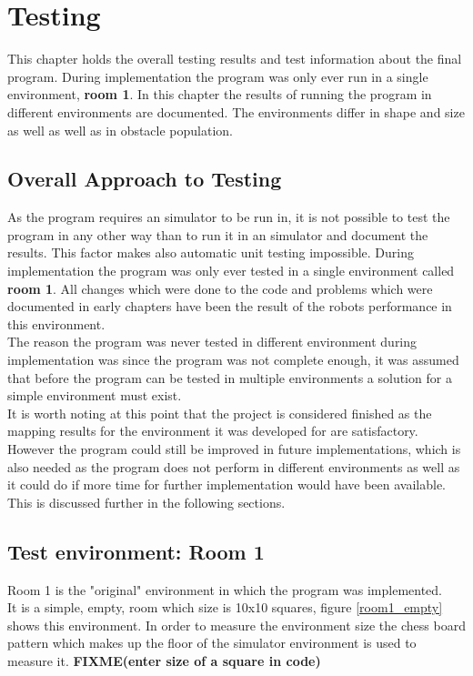 \chapter{Testing}
\label{Testing}
This chapter holds the overall testing results and test information about the final program.
During implementation the program was only ever run in a single environment, \textbf{room 1}.
In this chapter the results of running the program in different environments are documented. The environments differ in shape and size as well as well as in obstacle population.

\section{Overall Approach to Testing}
As the program requires an simulator to be run in, it is not possible to test the program in any other way than to run it in an simulator and document the results. This factor makes also automatic unit testing impossible. During implementation the program was only ever tested in a single environment called \textbf{room 1}. All changes which were done to the code and problems which were documented in early chapters have been the result of the robots performance in this environment. \\[3ex]

The reason the program was never tested in different environment during implementation was since the program was not complete enough, it was assumed that before the program can be tested in multiple environments a solution for a simple environment must exist.\\
It is worth noting at this point that the project is considered finished as the mapping results for the environment it was developed for are satisfactory. However the program could still be improved in future implementations, which is also needed as the program does not perform in different environments as well as it could do if more time for further implementation would have been available. 
This is discussed further in the following sections.

\section{Test environment: Room 1}
\label{room1}
Room 1 is the "original" environment in which the program was implemented. \\
It is a simple, empty, room which size is 10x10 squares, figure \ref{room1_empty} shows this environment. In order to measure the environment size the chess board pattern which makes up the floor of the simulator environment is used to measure it. \textbf{FIXME(enter size of a square in code)}\\

